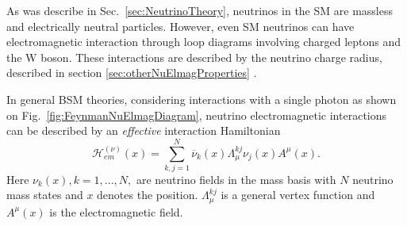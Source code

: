 
As was describe in Sec.~\ref{sec:NeutrinoTheory}, neutrinos in the \gls{SM} are massless and electrically neutral particles. However, even \gls{SM} neutrinos can have electromagnetic interaction through loop diagrams involving charged leptons and the W boson. These interactions are described by the neutrino charge radius, described in section \ref{sec:otherNuElmagProperties}  \cite{SnowmassNeutrinoFrontierReport.pdf}.


In general \gls{BSM} theories, considering interactions with a single photon as shown on Fig.~\ref{fig:FeynmanNuElmagDiagram}, neutrino electromagnetic interactions can be described by an \textit{effective} interaction Hamiltonian \cite{nuElmagInt2015.pdf}
\begin{equation}
\mathcal{H}^{\left(\nu\right)}_{em}\left(x\right)=\sum^N_{k,j=1}\overline{\nu}_k\left(x\right)\Lambda^{kj}_{\mu}\nu_j\left(x\right)A^{\mu}\left(x\right).
\end{equation}
Here $\nu_k\left(x\right), k = 1,...,N,$ are neutrino fields in the mass basis with $N$ neutrino mass states and $x$ denotes the position. $\Lambda^{kj}_{\mu}$ is a general vertex function and $A^{\mu}\left(x\right)$ is the electromagnetic field.

